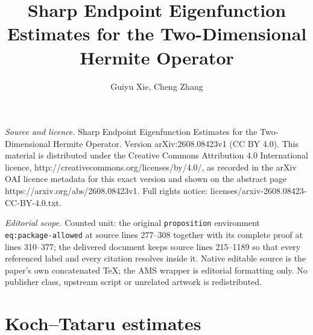 \documentclass[10pt,a4paper]{amsart}
\numberwithin{equation}{section}
\begin{document}
\title[Sharp Endpoint Eigenfunction Estimates for the Two-Dimension]{Sharp Endpoint Eigenfunction Estimates for the Two-Dimensional Hermite Operator}
\author{Guiyu Xie, Cheng Zhang}
\date{}
\maketitle
\noindent\emph{Source and licence.} Sharp Endpoint Eigenfunction Estimates for the Two-Dimensional Hermite Operator. Version arXiv:2608.08423v1 (CC BY 4.0). This material is distributed under the Creative Commons Attribution 4.0 International licence, http://creativecommons.org/licenses/by/4.0/, as recorded in the arXiv OAI licence metadata for this exact version and shown on the abstract page https://arxiv.org/abs/2608.08423v1. Full rights notice: licenses/arxiv-2608.08423-CC-BY-4.0.txt.\par\smallskip
\noindent\textit{Editorial scope.} Counted unit: the original \texttt{proposition} environment \texttt{eq:package-allowed} at source lines 277--308 together with its complete proof at lines 310--377; the delivered document keeps source lines 215--1189 so that every referenced label and every citation resolves inside it. Native editable source is the paper's own concatenated TeX; the AMS wrapper is editorial formatting only. No publisher class, upstream script or unrelated artwork is redistributed.
\section{Koch--Tataru estimates}\label{sec:local}
\end{document}
